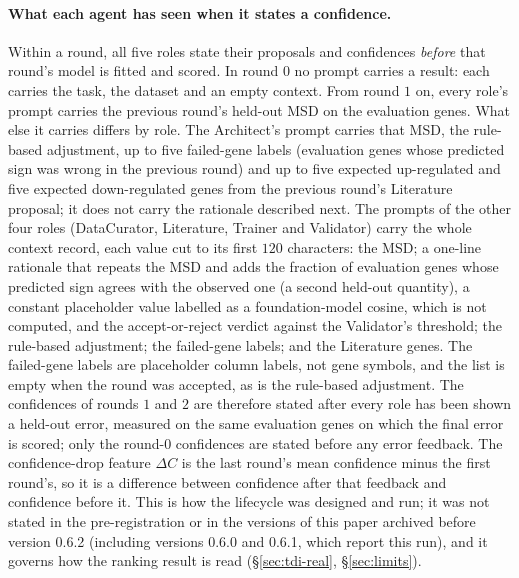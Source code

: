 \paragraph{What each agent has seen when it states a confidence.}\label{par:feedback}
Within a round, all five roles state their proposals and confidences \emph{before} that
round's model is fitted and scored. In round $0$ no prompt carries a result: each carries the
task, the dataset and an empty context. From round $1$ on, every role's prompt carries the
previous round's held-out MSD on the evaluation genes. What else it carries differs by role.
The Architect's prompt carries that MSD, the rule-based adjustment, up to five failed-gene
labels (evaluation genes whose predicted sign was wrong in the previous round) and up to five
expected up-regulated and five expected down-regulated genes from the previous round's
Literature proposal; it does not carry the rationale described next. The prompts of the other
four roles (DataCurator, Literature, Trainer and Validator) carry the whole context record,
each value cut to its first $120$ characters: the MSD; a one-line rationale that repeats the
MSD and adds the fraction of evaluation genes whose predicted sign agrees with the observed
one (a second held-out quantity), a constant placeholder value labelled as a foundation-model
cosine, which is not computed, and the accept-or-reject verdict against the Validator's
threshold; the rule-based adjustment; the failed-gene labels; and the Literature genes. The
failed-gene labels are placeholder column labels, not gene symbols, and the list is empty when
the round was accepted, as is the rule-based adjustment. The confidences of rounds $1$ and $2$
are therefore stated after every role has been shown a held-out error, measured on the same
evaluation genes on which the final error is scored; only the round-$0$ confidences are stated
before any error feedback. The confidence-drop feature $\Delta C$ is the last round's mean
confidence minus the first round's, so it is a difference between confidence after that
feedback and confidence before it. This is how the lifecycle was designed and run; it was not
stated in the pre-registration or in the versions of this paper archived before version 0.6.2
(including versions 0.6.0 and 0.6.1, which report this run), and it
governs how the ranking result is read (\S\ref{sec:tdi-real}, \S\ref{sec:limits}).

